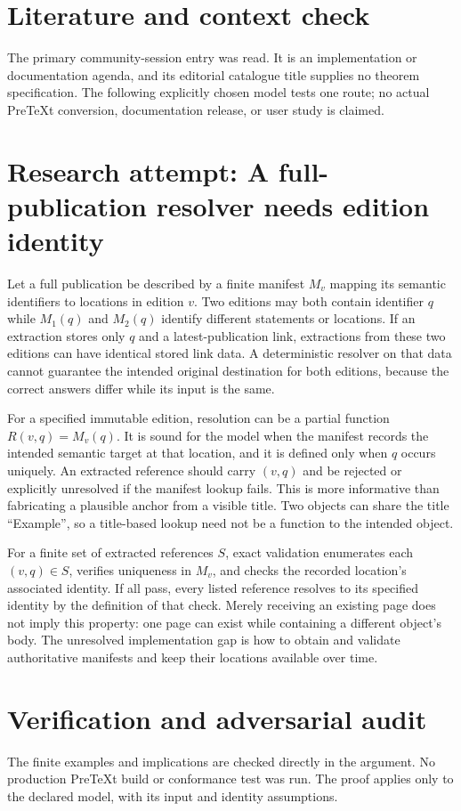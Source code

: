 \documentclass[11pt]{article}
\begin{document}
\section{Literature and context check}
The primary community-session entry was read. It is an implementation or documentation agenda, and its editorial catalogue title supplies no theorem specification. The following explicitly chosen model tests one route; no actual PreTeXt conversion, documentation release, or user study is claimed.
\section{Research attempt: A full-publication resolver needs edition identity}
Let a full publication be described by a finite manifest $M_v$ mapping its semantic identifiers to locations in edition $v$. Two editions may both contain identifier $q$ while $M_1(q)$ and $M_2(q)$ identify different statements or locations. If an extraction stores only $q$ and a latest-publication link, extractions from these two editions can have identical stored link data. A deterministic resolver on that data cannot guarantee the intended original destination for both editions, because the correct answers differ while its input is the same.

For a specified immutable edition, resolution can be a partial function $R(v,q)=M_v(q)$. It is sound for the model when the manifest records the intended semantic target at that location, and it is defined only when $q$ occurs uniquely. An extracted reference should carry $(v,q)$ and be rejected or explicitly unresolved if the manifest lookup fails. This is more informative than fabricating a plausible anchor from a visible title. Two objects can share the title ``Example'', so a title-based lookup need not be a function to the intended object.

For a finite set of extracted references $S$, exact validation enumerates each $(v,q)\in S$, verifies uniqueness in $M_v$, and checks the recorded location's associated identity. If all pass, every listed reference resolves to its specified identity by the definition of that check. Merely receiving an existing page does not imply this property: one page can exist while containing a different object's body. The unresolved implementation gap is how to obtain and validate authoritative manifests and keep their locations available over time.
\section{Verification and adversarial audit}
The finite examples and implications are checked directly in the argument. No production PreTeXt build or conformance test was run. The proof applies only to the declared model, with its input and identity assumptions.
\end{document}
